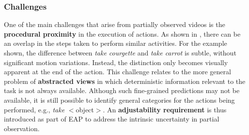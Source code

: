 \subsubsection{Challenges}

One of the main challenges that arise from partially observed videos is the \textbf{procedural proximity} in the execution of actions. As shown in , there can be an overlap in the steps taken to perform similar activities. For the example shown, the difference between \textit{take courgette} and \textit{take carrot} is subtle, without significant motion variations. Instead, the distinction only becomes visually apparent at the end of the action. This challenge relates to the more general problem of \textbf{abstracted views} in which deterministic information relevant to the task is not always available. Although such fine-grained predictions may not be available, it is still possible to identify general categories for the actions being performed, e.g., \textit{take} $<$object$>$. An \textbf{adjustability requirement} is thus introduced as part of EAP to address the intrinsic uncertainty in partial observation.


